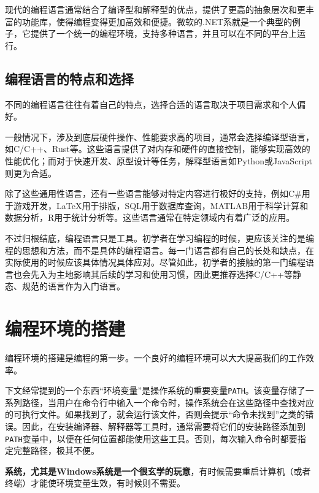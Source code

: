 现代的编程语言通常结合了编译型和解释型的优点，提供了更高的抽象层次和更丰富的功能库，使得编程变得更加高效和便捷。微软的.NET系就是一个典型的例子，它提供了一个统一的编程环境，支持多种语言，并且可以在不同的平台上运行。

\subsection{编程语言的特点和选择}

不同的编程语言往往有着自己的特点，选择合适的语言取决于项目需求和个人偏好。

一般情况下，涉及到底层硬件操作、性能要求高的项目，通常会选择编译型语言，如C/C++、Rust等。这些语言提供了对内存和硬件的直接控制，能够实现高效的性能优化；而对于快速开发、原型设计等任务，解释型语言如Python或JavaScript则更为合适。

除了这些通用性语言，还有一些语言能够对特定内容进行极好的支持，例如C\#用于游戏开发，LaTeX用于排版，SQL用于数据库查询，MATLAB用于科学计算和数据分析，R用于统计分析等。这些语言通常在特定领域内有着广泛的应用。

不过归根结底，编程语言只是工具。初学者在学习编程的时候，更应该关注的是编程的思想和方法，而不是具体的编程语言。每一门语言都有自己的长处和缺点，在实际使用的时候应该具体情况具体应对。尽管如此，初学者的接触的第一门编程语言也会先入为主地影响其后续的学习和使用习惯，因此更推荐选择C/C++等静态、规范的语言作为入门语言。

\section{编程环境的搭建}

编程环境的搭建是编程的第一步。一个良好的编程环境可以大大提高我们的工作效率。

\begin{note}
  下文经常提到的一个东西“环境变量”是操作系统的重要变量\texttt{PATH}。该变量存储了一系列路径，当用户在命令行中输入一个命令时，操作系统会在这些路径中查找对应的可执行文件。如果找到了，就会运行该文件，否则会提示“命令未找到”之类的错误。因此，在安装编译器、解释器等工具时，通常需要将它们的安装路径添加到\texttt{PATH}变量中，以便在任何位置都能使用这些工具。否则，每次输入命令时都要指定完整路径，极其不便。
\end{note}

\begin{tip}
  \textbf{系统，尤其是Windows系统是一个很玄学的玩意}，有时候需要重启计算机（或者终端）才能使环境变量生效，有时候则不需要。
\end{tip}

